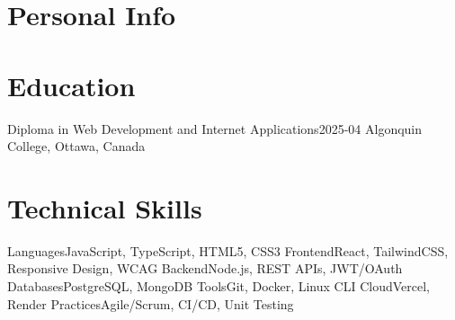 \documentclass[a4paper,10pt]{article}
\begin{document}

\section{Personal Info}

\section{Education}
\resumeSubHeadingListStart
  \resumeSubheading
    {Diploma in Web Development and Internet Applications}{2025-04}
    {Algonquin College, Ottawa, Canada}{}
\resumeSubHeadingListEnd

\section{Technical Skills}
\resumeSubHeadingListStart
  \resumeSubheading
    {Languages}{JavaScript, TypeScript, HTML5, CSS3}
  \resumeSubheading
    {Frontend}{React, TailwindCSS, Responsive Design, WCAG}
  \resumeSubheading
    {Backend}{Node.js, REST APIs, JWT/OAuth}
  \resumeSubheading
    {Databases}{PostgreSQL, MongoDB}
  \resumeSubheading
    {Tools}{Git, Docker, Linux CLI}
  \resumeSubheading
    {Cloud}{Vercel, Render}
  \resumeSubheading
    {Practices}{Agile/Scrum, CI/CD, Unit Testing}
\resumeSubHeadingListEnd
\end{document}
